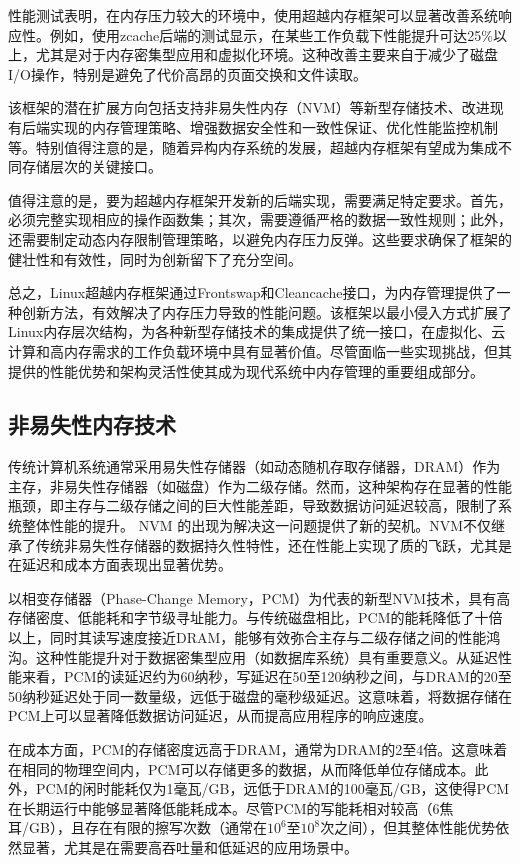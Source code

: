 性能测试表明，在内存压力较大的环境中，使用超越内存框架可以显著改善系统响应性。例如，使用zcache后端的测试显示，在某些工作负载下性能提升可达25\%以上，尤其是对于内存密集型应用和虚拟化环境。这种改善主要来自于减少了磁盘I/O操作，特别是避免了代价高昂的页面交换和文件读取。

该框架的潜在扩展方向包括支持非易失性内存（NVM）等新型存储技术、改进现有后端实现的内存管理策略、增强数据安全性和一致性保证、优化性能监控机制等。特别值得注意的是，随着异构内存系统的发展，超越内存框架有望成为集成不同存储层次的关键接口。

值得注意的是，要为超越内存框架开发新的后端实现，需要满足特定要求。首先，必须完整实现相应的操作函数集；其次，需要遵循严格的数据一致性规则；此外，还需要制定动态内存限制管理策略，以避免内存压力反弹。这些要求确保了框架的健壮性和有效性，同时为创新留下了充分空间。

总之，Linux超越内存框架通过Frontswap和Cleancache接口，为内存管理提供了一种创新方法，有效解决了内存压力导致的性能问题。该框架以最小侵入方式扩展了Linux内存层次结构，为各种新型存储技术的集成提供了统一接口，在虚拟化、云计算和高内存需求的工作负载环境中具有显著价值。尽管面临一些实现挑战，但其提供的性能优势和架构灵活性使其成为现代系统中内存管理的重要组成部分。

\subsection{非易失性内存技术}

传统计算机系统通常采用易失性存储器（如动态随机存取存储器，DRAM）作为主存，非易失性存储器（如磁盘）作为二级存储。然而，这种架构存在显著的性能瓶颈，即主存与二级存储之间的巨大性能差距，导致数据访问延迟较高，限制了系统整体性能的提升。 NVM 的出现为解决这一问题提供了新的契机。NVM不仅继承了传统非易失性存储器的数据持久性特性，还在性能上实现了质的飞跃，尤其是在延迟和成本方面表现出显著优势。

以相变存储器（Phase-Change Memory，PCM）为代表的新型NVM技术，具有高存储密度、低能耗和字节级寻址能力。与传统磁盘相比，PCM的能耗降低了十倍以上，同时其读写速度接近DRAM，能够有效弥合主存与二级存储之间的性能鸿沟。这种性能提升对于数据密集型应用（如数据库系统）具有重要意义。从延迟性能来看，PCM的读延迟约为60纳秒，写延迟在50至120纳秒之间，与DRAM的20至50纳秒延迟处于同一数量级，远低于磁盘的毫秒级延迟。这意味着，将数据存储在PCM上可以显著降低数据访问延迟，从而提高应用程序的响应速度。

在成本方面，PCM的存储密度远高于DRAM，通常为DRAM的2至4倍。这意味着在相同的物理空间内，PCM可以存储更多的数据，从而降低单位存储成本。此外，PCM的闲时能耗仅为1毫瓦/GB，远低于DRAM的100毫瓦/GB，这使得PCM在长期运行中能够显著降低能耗成本。尽管PCM的写能耗相对较高（6焦耳/GB），且存在有限的擦写次数（通常在$10^6$至$10^8$次之间），但其整体性能优势依然显著，尤其是在需要高吞吐量和低延迟的应用场景中。


